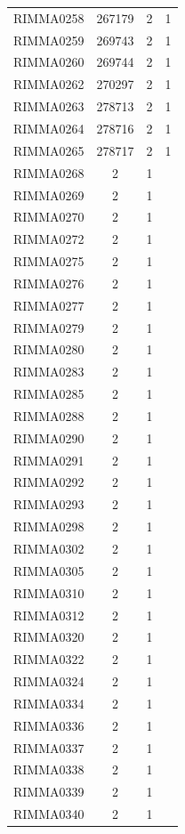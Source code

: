 \documentclass[11pt]{article}
\newcounter{rowno}
\begin{document}
\begin{scriptsize}
\begin{longtable}{>{\stepcounter{rowno}}cccc}
    RIMMA0258 & 267179 & 2     & 1 \\
    RIMMA0259 & 269743 & 2     & 1 \\
    RIMMA0260 & 269744 & 2     & 1 \\
    RIMMA0262 & 270297 & 2     & 1 \\
    RIMMA0263 & 278713 & 2     & 1 \\
    RIMMA0264 & 278716 & 2     & 1 \\
    RIMMA0265 & 278717 & 2     & 1 \\
    RIMMA0268 & 2     & 1 \\
    RIMMA0269 & 2     & 1 \\
    RIMMA0270 & 2     & 1 \\
    RIMMA0272 & 2     & 1 \\
    RIMMA0275 & 2     & 1 \\
    RIMMA0276 & 2     & 1 \\
    RIMMA0277 & 2     & 1 \\
    RIMMA0279 & 2     & 1 \\
    RIMMA0280 & 2     & 1 \\
    RIMMA0283 & 2     & 1 \\
    RIMMA0285 & 2     & 1 \\
    RIMMA0288 & 2     & 1 \\
    RIMMA0290 & 2     & 1 \\
    RIMMA0291 & 2     & 1 \\
    RIMMA0292 & 2     & 1 \\
    RIMMA0293 & 2     & 1 \\
    RIMMA0298 & 2     & 1 \\
    RIMMA0302 & 2     & 1 \\
    RIMMA0305 & 2     & 1 \\
    RIMMA0310 & 2     & 1 \\
    RIMMA0312 & 2     & 1 \\
    RIMMA0320 & 2     & 1 \\
    RIMMA0322 & 2     & 1 \\
    RIMMA0324 & 2     & 1 \\
    RIMMA0334 & 2     & 1 \\
    RIMMA0336 & 2     & 1 \\
    RIMMA0337 & 2     & 1 \\
    RIMMA0338 & 2     & 1 \\
    RIMMA0339 & 2     & 1 \\
    RIMMA0340 & 2     & 1 \\

\end{longtable}
\end{scriptsize}
\end{document}
